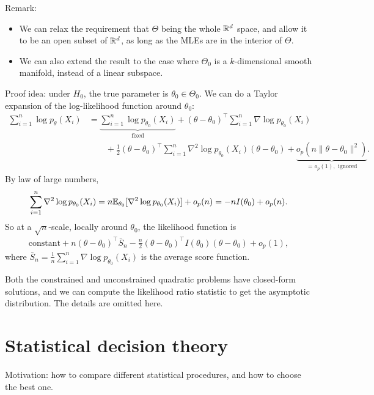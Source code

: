 \documentclass[11pt,letterpaper]{article}
\numberwithin{assumption}{lecture}
\numberwithin{theorem}{lecture}
\numberwithin{proposition}{lecture}
\numberwithin{lemma}{lecture}
\numberwithin{claim}{lecture}
\numberwithin{corollary}{lecture}
\numberwithin{definition}{lecture}
\numberwithin{conjecture}{lecture}
\numberwithin{remark}{lecture}
\numberwithin{example}{lecture}
\numberwithin{equation}{lecture}
\begin{document}
Remark:
\begin{itemize}
  \item We can relax the requirement that $\Theta$ being the whole $\mathbb{R}^d$ space, and allow it to be an open subset of $\mathbb{R}^d$, as long as the MLEs are in the interior of $\Theta$.
  \item We can also extend the result to the case where $\Theta_0$ is a $k$-dimensional smooth manifold, instead of a linear subspace.
\end{itemize}
Proof idea: under $H_0$, the true parameter is $\theta_0 \in \Theta_0$. We can do a Taylor expansion of the log-likelihood function around $\theta_0$:
\begin{align*}
  \sum_{i = 1}^n \log p_\theta (X_i) &= \underbrace{\sum_{i = 1}^n \log p_{\theta_0} (X_i)}_{\mbox{fixed}} + (\theta - \theta_0)^\top \sum_{i = 1}^n \nabla \log p_{\theta_0} (X_i)\\
  &\qquad + \frac{1}{2} (\theta - \theta_0)^\top \sum_{i = 1}^n \nabla^2 \log p_{\theta_0} (X_i) (\theta - \theta_0) + \underbrace{o_p(n \|\theta - \theta_0\|^2)}_{ = o_p (1), \mbox{ ignored}}.
\end{align*}
By law of large numbers,
\begin{align*}
  \sum_{i = 1}^n \nabla^2 \log p_{\theta_0} (X_i) = n {\mathbb{E}}_{\theta_0} [\nabla^2 \log p_{\theta_0} (X_i)] + o_p(n) = - n I(\theta_0) + o_p(n).
\end{align*}
So at a $\sqrt{n}$-scale, locally around $\theta_0$, the likelihood function is
\begin{align*}
  \mbox{constant} + n (\theta - \theta_0)^\top \bar{S}_n - \frac{n}{2} (\theta - \theta_0)^\top I(\theta_0) (\theta - \theta_0) + o_p (1),
\end{align*}
where $\bar{S}_n = \frac{1}{n} \sum_{i=1}^n \nabla \log p_{\theta_0} (X_i)$ is the average score function.

Both the constrained and unconstrained quadratic problems have closed-form solutions, and we can compute the likelihood ratio statistic to get the asymptotic distribution. The details are omitted here.

\section{Statistical decision theory}
Motivation: how to compare different statistical procedures, and how to choose the best one.

\bigskip
\end{document}
